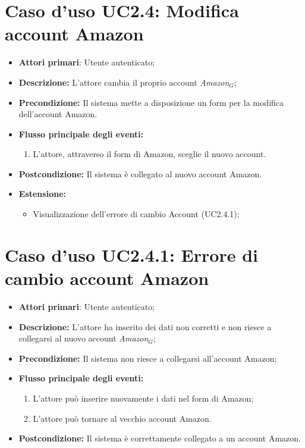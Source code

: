 \section{Caso d'uso UC2.4: Modifica account Amazon }
\begin{itemize}
	\item \textbf{Attori primari}: Utente autenticato;
	\item \textbf{Descrizione:} L'attore cambia il proprio account \textit{Amazon$_{G}$};
	\item \textbf{Precondizione:} Il sistema mette a disposizione un form per la modifica dell'account Amazon.
	\item \textbf{Flusso principale degli eventi:}
	\begin{enumerate}
		\item L'attore, attraverso il form di Amazon, sceglie il nuovo account.
	\end{enumerate}
	\item \textbf{Postcondizione:} Il sistema è collegato al nuovo account Amazon.
	\item \textbf{Estensione:}
	\begin{itemize}
		\item Visualizzazione dell'errore di cambio Account (UC2.4.1);
	\end{itemize}
\end{itemize}
\section{Caso d'uso UC2.4.1: Errore di cambio account Amazon }
\begin{itemize}
	\item \textbf{Attori primari}: Utente autenticato;
	\item \textbf{Descrizione:} L'attore ha inserito dei dati non corretti e non riesce a collegarsi al nuovo account \textit{Amazon$_{G}$};
	\item \textbf{Precondizione:} Il sistema non riesce a collegarsi all'account Amazon;
	\item \textbf{Flusso principale degli eventi:}
	\begin{enumerate}
		\item L'attore può inserire nuovamente i dati nel form di Amazon;
		\item L'attore può tornare al vecchio account Amazon.
	\end{enumerate}
	\item \textbf{Postcondizione:} Il sistema è correttamente collegato a un account Amazon.
\end{itemize}
